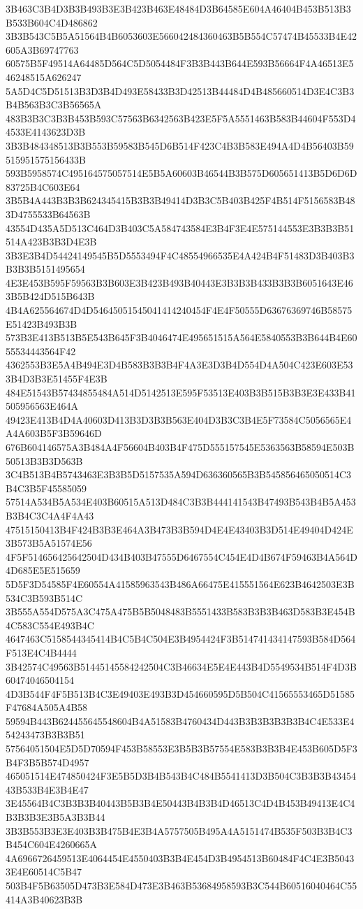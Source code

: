 {{{{{{{{{{{{{{{{{{{{{3B463C3B4D3B3B493B3E3B423B463E48484D3B64585E604A46404B453B513B3B533B604C4D486862
3B3B543C5B5A51564B4B6053603E566042484360463B5B554C57474B45533B4E42605A3B69747763
60575B5F49514A64485D564C5D5054484F3B3B443B644E593B56664F4A46513E546248515A626247
5A5D4C5D51513B3D3B4D493E58433B3D42513B44484D4B485660514D3E4C3B3B4B563B3C3B56565A
483B3B3C3B3B453B593C57563B6342563B423E5F5A5551463B583B44604F553D44533E4143623D3B
3B3B484348513B3B553B59583B545D6B514F423C4B3B583E494A4D4B56403B59515951575156433B
593B5958574C495164575057514E5B5A60603B46544B3B575D605651413B5D6D6D83725B4C603E64
3B5B4A443B3B3B624345415B3B3B49414D3B3C5B403B425F4B514F5156583B483D4755533B64563B
43554D435A5D513C464D3B403C5A584743584E3B4F3E4E575144553E3B3B3B51514A423B3B3D4E3B
3B3E3B4D54424149545B5D5553494F4C48554966535E4A424B4F51483D3B403B3B3B3B5151495654
4E3E453B595F59563B3B603E3B423B493B40443E3B3B3B433B3B3B6051643E463B5B424D515B643B
4B4A625564674D4D54645051545041414240454F4E4F50555D63676369746B58575E51423B493B3B
573B3E413B513B5E543B645F3B4046474E495651515A564E5840553B3B644B4E6055534443564F42
4362553B3E5A4B494E3D4B583B3B3B4F4A3E3D3B4D554D4A504C423E603E533B4D3B3E51455F4E3B
484E51543B57434855484A514D5142513E595F53513E403B3B515B3B3E3E433B41505956563E464A
49423E413B4D4A40603D413B3D3B3B563E404D3B3C3B4E5F73584C5056565E4A4A603B5F3B59646D
676B604146575A3B484A4F56604B403B4F475D555157545E5363563B58594E503B50513B3B3D563B
3C4B513B4B5743463E3B3B5D5157535A594D636360565B3B545856465050514C3B4C3B5F45585059
57514A534B5A534E403B60515A513D484C3B3B444141543B47493B543B4B5A453B3B4C3C4A4F4A43
47515150413B4F424B3B3E464A3B473B3B594D4E4E43403B3D514E49404D424E3B573B5A51574E56
4F5F514656425642504D434B403B47555D6467554C454E4D4B674F59463B4A564D4D685E5E515659
5D5F3D54585F4E60554A41585963543B486A66475E415551564E623B4642503E3B534C3B593B514C
3B555A554D575A3C475A475B5B5048483B5551433B583B3B3B463D583B3E454B4C583C554E493B4C
4647463C5158544345414B4C5B4C504E3B4954424F3B514741434147593B584D564F513E4C4B4444
3B42574C49563B51445145584242504C3B46634E5E4E443B4D5549534B514F4D3B60474046504154
4D3B544F4F5B513B4C3E49403E493B3D454660595D5B504C41565553465D51585F47684A505A4B58
59594B443B624455645548604B4A51583B4760434D443B3B3B3B3B3B4C4E533E454243473B3B3B51
57564051504E5D5D70594F453B58553E3B5B3B57554E583B3B3B4E453B605D5F3B4F3B5B574D4957
465051514E474850424F3E5B5D3B4B543B4C484B5541413D3B504C3B3B3B4345443B533B4E3B4E47
3E45564B4C3B3B3B40443B5B3B4E50443B4B3B4D46513C4D4B453B49413E4C4B3B3B3E3B5A3B3B44
3B3B553B3E3E403B3B475B4E3B4A5757505B495A4A5151474B535F503B3B4C3B454C604E4260665A
4A6966726459513E4064454E4550403B3B4E454D3B4954513B60484F4C4E3B50433E4E60514C5B47
503B4F5B63505D473B3E584D473E3B463B53684958593B3C544B60516040464C55414A3B40623B3B
}}}}}}}}}}}}}}}}}}}}}
